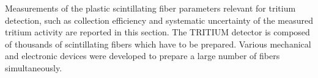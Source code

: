 Measurements of the plastic scintillating fiber parameters relevant for tritium detection, such as collection efficiency and systematic uncertainty of the measured tritium activity are reported in this section. The TRITIUM detector is composed of thousands of scintillating fibers which have to be prepared. Various mechanical and electronic devices were developed to prepare a large number of fibers simultaneously.
